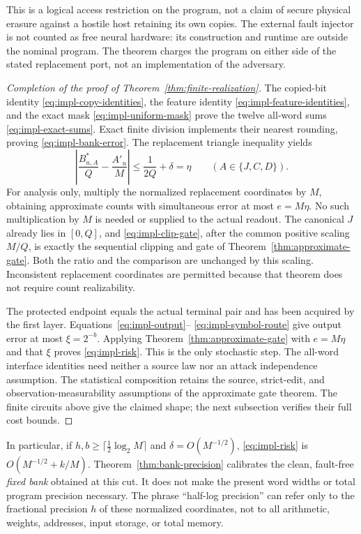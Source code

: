 This is a logical access restriction on the program, not a claim of
secure physical erasure against a hostile host retaining its own copies.
The external fault injector is not counted as free neural hardware: its
construction and runtime are outside the nominal program. The theorem
charges the program on either side of the stated replacement port, not
an implementation of the adversary.

\begin{proof}[Completion of the proof of Theorem~\ref{thm:finite-realization}]
The copied-bit identity \eqref{eq:impl-copy-identities}, the feature
identity \eqref{eq:impl-feature-identities}, and the exact mask
\eqref{eq:impl-uniform-mask} prove the twelve all-word sums
\eqref{eq:impl-exact-sums}. Exact finite division implements their nearest
rounding, proving \eqref{eq:impl-bank-error}. The replacement triangle
inequality yields
\[
 \left|\frac{B^*_{u,A}}Q-\frac{A'_u}M\right|
 \le\frac1{2Q}+\delta=\eta
 \qquad(A\in\{J,C,D\}).
\]
For analysis only, multiply the normalized replacement coordinates by
$M$, obtaining approximate counts with simultaneous error at most
$e=M\eta$. No such multiplication by $M$ is needed or supplied to the
actual readout. The canonical $J$ already lies in $[0,Q]$, and
\eqref{eq:impl-clip-gate}, after the common positive scaling $M/Q$,
is exactly the sequential clipping and gate of
Theorem~\ref{thm:approximate-gate}. Both the ratio and the comparison are
unchanged by this scaling. Inconsistent replacement coordinates are
permitted because that theorem does not require count realizability.

The protected endpoint equals the actual terminal pair and has been
acquired by the first layer. Equations~\eqref{eq:impl-output}--
\eqref{eq:impl-symbol-route} give output error at most $\xi=2^{-b}$.
Applying Theorem~\ref{thm:approximate-gate} with $e=M\eta$ and that $\xi$
proves \eqref{eq:impl-risk}. This is the only stochastic step. The
all-word interface identities need neither a source law nor an attack
independence assumption. The statistical composition retains the source,
strict-edit, and observation-measurability assumptions of the approximate
gate theorem. The finite circuits above give the claimed shape; the next
subsection verifies their full cost bounds.
\end{proof}

In particular, if $h,b\ge\lceil\tfrac12\log_2M\rceil$ and
$\delta=O(M^{-1/2})$, \eqref{eq:impl-risk} is
$O(M^{-1/2}+k/M)$. Theorem~\ref{thm:bank-precision} calibrates the clean,
fault-free \emph{fixed bank} obtained at this cut. It does not make the
present word widths or total program precision necessary. The phrase
``half-log precision'' can refer only to the fractional precision $h$ of
these normalized coordinates, not to all arithmetic, weights, addresses,
input storage, or total memory.

